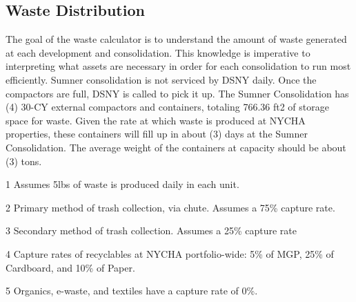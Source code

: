 \textcolor{ccorange}{\section{Waste Distribution}}

The goal of the waste calculator is to understand the amount of waste generated at each development and consolidation. This knowledge is imperative to interpreting what assets are necessary in order for each consolidation to run most efficiently. Sumner consolidation is not serviced by DSNY daily. Once the compactors are full, DSNY is called to pick it up. The Sumner Consolidation has (4) 30-CY external compactors and containers, totaling 766.36 ft2 of storage space for waste. Given the rate at which waste is produced at NYCHA properties, these containers will fill up in about (3) days at the Sumner Consolidation. The average weight of the containers at capacity should be about (3) tons.

\begin{table}[H]
\begin{threeparttable}
\small



\begin{tablenotes}
\item [1] Assumes 5lbs of waste is produced daily in each unit.
\item [2] Primary method of trash collection, via chute. Assumes a 75\% capture rate.
\item [3] Secondary method of trash collection. Assumes a 25\% capture rate
\item [4] Capture rates of recyclables at NYCHA portfolio-wide: 5\% of MGP, 25\% of Cardboard, and 10\% of Paper. 
\item[5] Organics, e-waste, and textiles have a capture rate of 0\%.
\end{tablenotes}
\end{threeparttable}
\end{table}
\pagebreak


